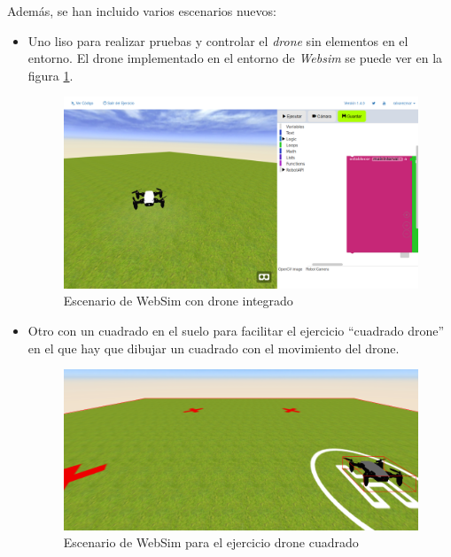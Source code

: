 Además, se han incluido varios escenarios nuevos:
\begin{itemize}
    \item Uno liso para realizar pruebas y controlar el \textit{drone} sin elementos en el entorno. El drone implementado en el entorno de \textit{Websim} se puede ver en la figura \ref{fig:escenarioDrone}.
    
    \begin{figure}[H]
    \centering
    \includegraphics[scale=0.3]{img/websimDrone.png}
    \caption{Escenario de WebSim con drone integrado} \label{fig:escenarioDrone}
    \end{figure}
    
    \item Otro con un cuadrado en el suelo para facilitar el ejercicio ``cuadrado drone'' en el que hay que dibujar un cuadrado con el movimiento del drone.
    
      \begin{figure}[H]
    \centering
    \includegraphics[scale=0.4]{img/cuadradoDrone.png}
    \caption{Escenario de WebSim para el ejercicio drone cuadrado} \label{fig:droneCuadrado}
    \end{figure}
    

\end{itemize}
